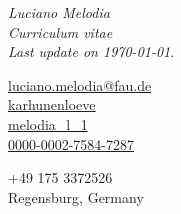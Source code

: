 \documentclass[a4paper, 11pt]{article}
\begin{document}
	{\Huge \emph{Luciano Melodia}}\\[0.1cm] \emph{Curriculum vitae}\\ \emph{Last
	update on \today}.

	\begin{flushleft}
		\scriptsize
		\begin{minipage}{0.3\textwidth}
			{\footnotesize \faEnvelope} \hspace{0.1cm} \href{mailto:luciano.melodia@fau.de}{luciano.melodia@fau.de}\\[0.05cm]
			{\footnotesize \faGithub} \hspace{0.15cm}
			\href{https://github.com/karhunenloeve}{karhunenloeve}\\[0.05cm] {\footnotesize \aiarXiv}
			\hspace{0.1cm} \href{https://arxiv.org/a/melodia_l_1}{melodia\_l\_1}\\[0.05cm]
			{\footnotesize \aiOrcid} \hspace{0.1cm}
			\href{https://orcid.org/0000-0002-7584-7287}{0000-0002-7584-7287}
		\end{minipage}
		\begin{minipage}{0.4\textwidth}
			{\footnotesize \faPhone} \hspace{0.20cm} +49 175 3372526 \\[0.05cm]
			{\footnotesize \faMapO} \hspace{0.1cm} Regensburg, Germany
		\end{minipage}
	\end{flushleft}

\end{document}
